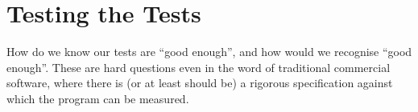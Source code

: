 \section{Testing the Tests}
How do we know our tests are ``good enough'', and how would we recognise ``good enough''. These are hard questions even in the word of traditional commercial software, where there is (or at least should be) a rigorous specification against which the program can be measured.
